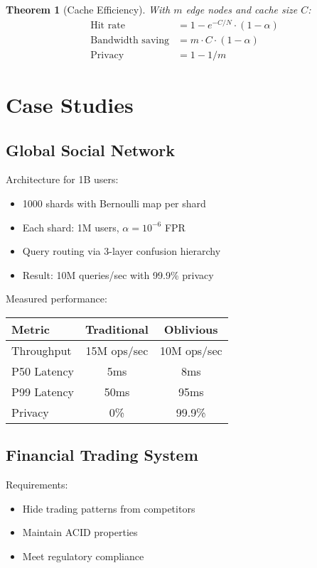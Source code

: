 \documentclass[11pt,final]{article}
\newtheorem{theorem}{Theorem}[section]
\begin{document}
\begin{theorem}[Cache Efficiency]
With $m$ edge nodes and cache size $C$:
\begin{align}
\text{Hit rate} &= 1 - e^{-C/N} \cdot (1-\alpha) \\
\text{Bandwidth saving} &= m \cdot C \cdot (1-\alpha) \\
\text{Privacy} &= 1 - 1/m
\end{align}
\end{theorem}

\section{Case Studies}

\subsection{Global Social Network}

Architecture for 1B users:
\begin{itemize}
    \item 1000 shards with Bernoulli map per shard
    \item Each shard: 1M users, $\alpha = 10^{-6}$ FPR
    \item Query routing via 3-layer confusion hierarchy
    \item Result: 10M queries/sec with 99.9\% privacy
\end{itemize}

Measured performance:
\begin{center}
\begin{tabular}{lcc}
\toprule
\textbf{Metric} & \textbf{Traditional} & \textbf{Oblivious} \\
\midrule
Throughput & 15M ops/sec & 10M ops/sec \\
P50 Latency & 5ms & 8ms \\
P99 Latency & 50ms & 95ms \\
Privacy & 0\% & 99.9\% \\
\bottomrule
\end{tabular}
\end{center}

\subsection{Financial Trading System}

Requirements:
\begin{itemize}
    \item Hide trading patterns from competitors
    \item Maintain ACID properties
    \item Meet regulatory compliance
\end{itemize}
\end{document}
